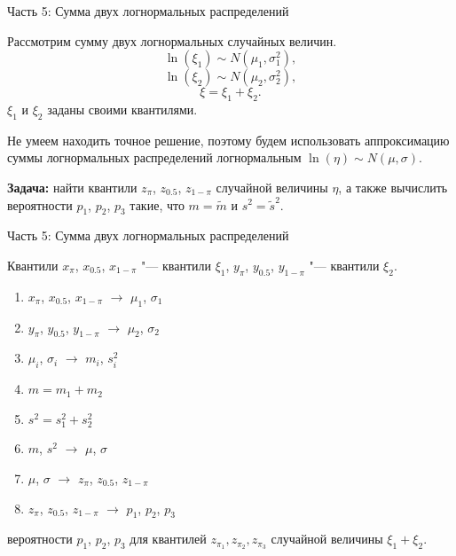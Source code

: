 \documentclass[ucs, notheorems, handout]{beamer}
\newenvironment{pr1}{\par\noindent{\bf Дано:}}{}
\newenvironment{pr3}{\par\noindent{\bf Результат:}}{}
\begin{document}
\begin{frame}{Часть 5: Сумма двух логнормальных распределений }
	
		Рассмотрим сумму двух логнормальных случайных величин.
	\begin{equation*}
		\ln(\xi_{1}) \sim N(\mu_{1}, \sigma _{1}^{2}),
	\end{equation*}
	\begin{equation*}
		\ln(\xi_{2}) \sim N(\mu_{2}, \sigma _{2}^{2}),
	\end{equation*}
	\begin{equation*}
		\xi = \xi_{1}+\xi_{2}.
	\end{equation*}
	$\xi_{1}$ и $\xi_{2}$ заданы своими квантилями.
	\bigskip
	
	Не умеем находить точное решение, поэтому будем использовать аппроксимацию суммы логнормальных распределений логнормальным $\ln(\eta)\sim N(\mu, \sigma)$.
	
	\bigskip
	
	\textbf{Задача:} найти квантили $z_{\pi}$, $z_{0.5}$, $z_{1-\pi}$ случайной величины $\eta$, а также вычислить вероятности $p_{1}$, $p_{2}$, $p_{3}$ такие, что $m = \tilde{m}$  и $s^{2} = \tilde{s}^{2}$.

	
\end{frame}

\begin{frame}{Часть 5: Сумма двух логнормальных распределений}
	
	\begin{pr1}
		Квантили $x_{\pi}$, $x_{0.5}$, $x_{1-\pi}$ "--- квантили $\xi_{1}$, $y_{\pi}$, $y_{0.5}$, $y_{1-\pi}$ "--- квантили $\xi_{2}$.
	\end{pr1}
	\begin{enumerate}
		\item $x_{\pi}$, $x_{0.5}$, $x_{1-\pi}$ $\rightarrow$  $\mu_{1}$, $\sigma_{1}$
		\item $y_{\pi}$, $y_{0.5}$, $y_{1-\pi}$ $\rightarrow$ $\mu_{2}$, $\sigma_{2}$
		\item $\mu_{i}$, $\sigma_{i}$ $\rightarrow$ $m_{i}$, $s_{i}^{2}$
		\item $m = m_{1}+m_{2}$
		\item $s^{2}=s_{1}^{2} + s_{2}^{2}$
		\item $m$, $s^{2}$ $\rightarrow$ $\mu$, $\sigma$
		\item $\mu$, $\sigma$ $\rightarrow$ $z_{\pi}$, $z_{0.5}$, $z_{1-\pi}$
		\item $z_{\pi}$, $z_{0.5}$, $z_{1-\pi}$ $\rightarrow$ $p_{1}$, $p_{2}$, $p_{3}$
		
	\end{enumerate}
\begin{pr3}\end{pr3} вероятности $p_{1}$, $p_{2}$, $p_{3}$ для квантилей $z_{\pi_{1}}, z_{\pi_{2}}, z_{\pi_{3}}$ случайной величины $\xi_{1} + \xi_{2}$.
	
\end{frame}
	
\end{document}
